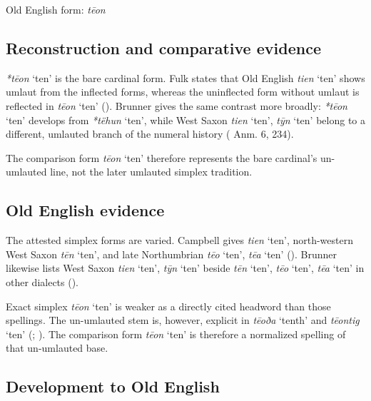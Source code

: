 \documentclass[
  british,
  a4paper,
  openany]{book}
\providecommand{\Recon}[1]{\emph{*#1}}
{\catcode`→=\active \global\def→{\ensuremath{\rightarrow}}}
\providecommand{\Recon}[1]{\emph{*#1}}
{\catcode`→=\active \global\def→{\ensuremath{\rightarrow}}}
\begin{document}
Old English form: \emph{tēon}

\subsection{Reconstruction and comparative
evidence}\label{reconstruction-and-comparative-evidence-71}

\Recon{tēon} `ten' is the bare cardinal form. Fulk states that Old
English \emph{tien} `ten' shows umlaut from the inflected forms, whereas
the uninflected form without umlaut is reflected in \emph{tēon} `ten'
(). Brunner gives the same
contrast more broadly: \Recon{tēon} `ten' develops from \Recon{tëhun}
`ten', while West Saxon \emph{tien} `ten', \emph{tȳn} `ten' belong to a
different, umlauted branch of the numeral history
( Anm.
6, 234).

The comparison form \emph{tēon} `ten' therefore represents the bare
cardinal's un-umlauted line, not the later umlauted simplex tradition.

\subsection{Old English evidence}\label{old-english-evidence-71}

The attested simplex forms are varied. Campbell gives \emph{tien} `ten',
north-western West Saxon \emph{tēn} `ten', and late Northumbrian
\emph{tēo} `ten', \emph{tēa} `ten' (). Brunner likewise lists West Saxon \emph{tien} `ten',
\emph{tȳn} `ten' beside \emph{tēn} `ten', \emph{tēo} `ten', \emph{tēa}
`ten' in other dialects ().

Exact simplex \emph{tēon} `ten' is weaker as a directly cited headword
than those spellings. The un-umlauted stem is, however, explicit in
\emph{tēoða} `tenth' and \emph{tēontig} `ten'
(;
). The comparison form
\emph{tēon} `ten' is therefore a normalized spelling of that un-umlauted
base.

\subsection{Development to Old
English}\label{development-to-old-english-71}
\end{document}

